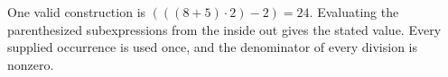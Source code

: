 One valid construction is $\boxed{(((8+5)\cdot 2)-2)=24}$. Evaluating the parenthesized subexpressions from the inside out gives the stated value. Every supplied occurrence is used once, and the denominator of every division is nonzero.
